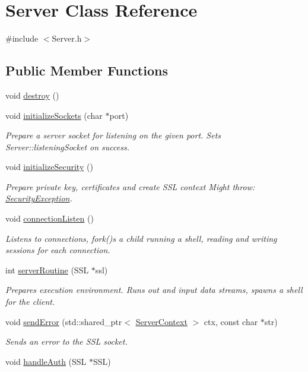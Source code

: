 \hypertarget{classServer}{}\section{Server Class Reference}
\label{classServer}


{\ttfamily \#include $<$Server.\+h$>$}

\subsection*{Public Member Functions}
\begin{DoxyCompactItemize}
\item 
void \hyperlink{classServer_adce993ab4cce22dc732bddddf310a5f6}{destroy} ()
\item 
void \hyperlink{classServer_afee42c59df0ce3e03fa5d6ed2b1cdccc}{initialize\+Sockets} (char $\ast$port)
\begin{DoxyCompactList}\small\item\em Prepare a server socket for listening on the given port. Sets Server\+::listening\+Socket on success. \end{DoxyCompactList}\item 
void \hyperlink{classServer_a54da775247c049b9cc78c92946bb058a}{initialize\+Security} ()
\begin{DoxyCompactList}\small\item\em Prepare private key, certificates and create S\+SL context Might throw\+: \hyperlink{classSecurityException}{Security\+Exception}. \end{DoxyCompactList}\item 
void \hyperlink{classServer_a258c0a0a42d0be99bc4a36b4e6212ed2}{connection\+Listen} ()
\begin{DoxyCompactList}\small\item\em Listens to connections, fork()\textquotesingle{}s a child running a shell, reading and writing sessions for each connection. \end{DoxyCompactList}\item 
int \hyperlink{classServer_a47b6e405d109cdd27838220684f0e2e5}{server\+Routine} (S\+SL $\ast$ssl)
\begin{DoxyCompactList}\small\item\em Prepares execution environment. Runs out and input data streams, spawns a shell for the client. \end{DoxyCompactList}\item 
void \hyperlink{classServer_abc80f4931ae5b5860a9f70ffac1b89c5}{send\+Error} (std\+::shared\+\_\+ptr$<$ \hyperlink{structServerContext}{Server\+Context} $>$ ctx, const char $\ast$str)
\begin{DoxyCompactList}\small\item\em Sends an error to the S\+SL socket. \end{DoxyCompactList}\item 
void \hyperlink{classServer_ac294087f9009b03cfb1a7476fbac050c}{handle\+Auth} (S\+SL $\ast$S\+SL)
\end{DoxyCompactItemize}
